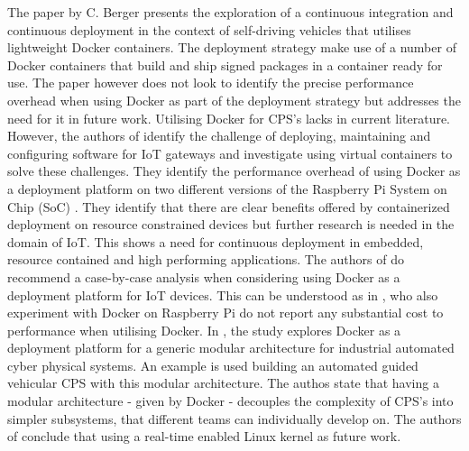 The paper by C. Berger \cite{cberger} presents the exploration of a continuous integration and continuous deployment in the context of self-driving vehicles that utilises lightweight Docker containers. The deployment strategy make use of a number of Docker containers that build and ship signed packages in a container ready for use. The paper however does not look to identify the precise performance overhead when using Docker as part of the deployment strategy but addresses the need for it in future work. Utilising Docker for CPS's lacks in current literature. However, the authors of \cite{2iot} identify the challenge of deploying, maintaining and configuring software for IoT gateways and investigate using virtual containers to solve these challenges. They identify the performance overhead of using Docker as a deployment platform on two different versions of the Raspberry Pi System on Chip (SoC) \cite{raspberry}. They identify that there are clear benefits offered by containerized deployment on resource constrained devices but further research is needed in the domain of IoT. This shows a need for continuous deployment in embedded, resource contained and high performing applications. The authors of \cite{2iot} do recommend a case-by-case analysis when considering using Docker as a deployment platform for IoT devices. This can be understood as in \cite{gonz}, who also experiment with Docker on Raspberry Pi do not report any substantial cost to performance when utilising Docker. In \cite{gonz}, the study explores Docker as a deployment platform for a generic modular architecture for industrial automated cyber physical systems. An example is used building an automated guided vehicular CPS with this modular architecture. The authos state that having a modular architecture - given by Docker - decouples the complexity of CPS's into simpler subsystems, that different teams can individually develop on. The authors of \cite{gonz} conclude that using a real-time enabled Linux kernel as future work. \\

